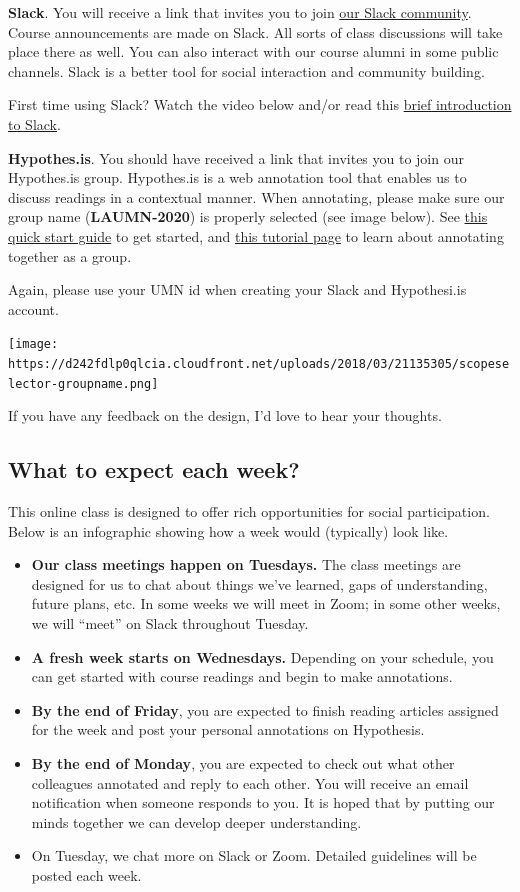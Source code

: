 \documentclass[
]{book}
\providecommand{\tightlist}{%
  \setlength{\itemsep}{0pt}\setlength{\parskip}{0pt}}
\begin{document}
\textbf{Slack}. You will receive a link that invites you to join \href{https://la-mn.slack.com/}{our Slack community}. Course announcements are made on Slack. All sorts of class discussions will take place there as well. You can also interact with our course alumni in some public channels. Slack is a better tool for social interaction and community building.

First time using Slack? Watch the video below and/or read this \href{https://get.slack.help/hc/en-us/articles/115004071768-What-is-Slack-}{brief introduction to Slack}.

\textbf{Hypothes.is}. You should have received a link that invites you to join our Hypothes.is group. Hypothes.is is a web annotation tool that enables us to discuss readings in a contextual manner. When annotating, please make sure our group name (\textbf{LAUMN-2020}) is properly selected (see image below). See \href{https://web.hypothes.is/help/quick-start-guide/}{this quick start guide} to get started, and \href{https://web.hypothes.is/help/annotating-with-groups/}{this tutorial page} to learn about annotating together as a group.

Again, please use your UMN id when creating your Slack and Hypothesi.is account.

\texttt{[image: https://d242fdlp0qlcia.cloudfront.net/uploads/2018/03/21135305/scopeselector-groupname.png]}

If you have any feedback on the design, I'd love to hear your thoughts.

\hypertarget{schedule}{%
\subsection{What to expect each week?}\label{schedule}}

This online class is designed to offer rich opportunities for social participation. Below is an infographic showing how a week would (typically) look like.

\begin{itemize}
\tightlist
\item
  \textbf{Our class meetings happen on Tuesdays.} The class meetings are designed for us to chat about things we've learned, gaps of understanding, future plans, etc. In some weeks we will meet in Zoom; in some other weeks, we will ``meet'' on Slack throughout Tuesday.
\item
  \textbf{A fresh week starts on Wednesdays.} Depending on your schedule, you can get started with course readings and begin to make annotations.
\item
  \textbf{By the end of Friday}, you are expected to finish reading articles assigned for the week and post your personal annotations on Hypothesis.
\item
  \textbf{By the end of Monday}, you are expected to check out what other colleagues annotated and reply to each other. You will receive an email notification when someone responds to you. It is hoped that by putting our minds together we can develop deeper understanding.
\item
  On Tuesday, we chat more on Slack or Zoom. Detailed guidelines will be posted each week.
\end{itemize}
\end{document}
